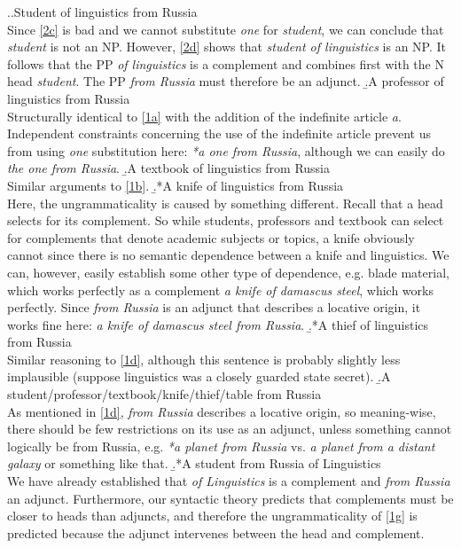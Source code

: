 \documentclass[a4paper,12pt]{article}
\begin{document}
\begin{enumerate}
        \ex.\a.\label{1a}Student of linguistics from Russia\\
        	Since \ref{2c} is bad and we cannot substitute \textit{one} for \textit{student}, we can conclude that \textit{student} is not an NP. However, \ref{2d} shows that \textit{student of linguistics} is an NP. It follows that the PP \textit{of linguistics} is a complement and combines first with the N head \textit{student}. The PP \textit{from Russia} must therefore be an adjunct.
        \b.\label{1b}A professor of linguistics from Russia\\
        	Structurally identical to \ref{1a} with the addition of the indefinite article \textit{a}. Independent constraints concerning the use of the indefinite article prevent us from using \textit{one} substitution here: \textit{*a one from Russia}, although we can easily do \textit{the one from Russia}.
        \b.\label{1c}A textbook of linguistics from Russia\\
        	Similar arguments to \ref{1b}.
        \b.*\label{1d}A knife of linguistics from Russia\\
        	Here, the ungrammaticality is caused by something different. Recall that a head selects for its complement. So while students, professors and textbook can select for complements that denote academic subjects or topics, a knife obviously cannot since there is no semantic dependence between a knife and linguistics. We can, however, easily establish some other type of dependence, e.g. blade material, which works perfectly as a complement \textit{a knife of damascus steel}, which works perfectly. Since \textit{from Russia} is an adjunct that describes a locative origin, it works fine here: \textit{a knife of damascus steel from Russia}.
        \b.*\label{1e}A thief of linguistics from Russia\\
       		Similar reasoning to \ref{1d}, although this sentence is probably slightly less implausible (suppose linguistics was a closely guarded state secret).
        \b.\label{1f}A student/professor/textbook/knife/thief/table from Russia\\
        	As mentioned in \ref{1d}, \textit{from Russia} describes a locative origin, so meaning-wise, there should be few restrictions on its use as an adjunct, unless something cannot logically be from Russia, e.g. \textit{*a planet from Russia} vs. \textit{a planet from a distant galaxy} or something like that.
        \b.*\label{1g}A student from Russia of Linguistics\\
        	We have already established that \textit{of Linguistics} is a complement and \textit{from Russia} an adjunct. Furthermore, our syntactic theory predicts that complements must be closer to heads than adjuncts, and therefore the ungrammaticality of \ref{1g} is predicted because the adjunct intervenes between the head and complement.

\end{enumerate}
\end{document}

